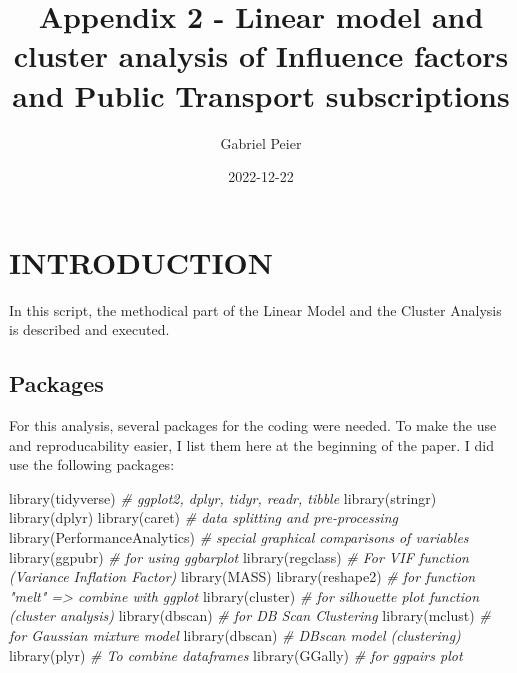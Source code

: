 \documentclass[
]{article}
\title{Appendix 2 - Linear model and cluster analysis of Influence
factors and Public Transport subscriptions}
\author{Gabriel Peier}
\date{2022-12-22}
\newenvironment{Shaded}{\begin{snugshade}}{\end{snugshade}}
\newcommand{\CommentTok}[1]{\textcolor[rgb]{0.56,0.35,0.01}{\textit{#1}}}
\newcommand{\FunctionTok}[1]{\textcolor[rgb]{0.00,0.00,0.00}{#1}}
\newcommand{\NormalTok}[1]{#1}
\begin{document}
\maketitle

\graphicspath{ {G:/My Drive/MasterThesis/Scripts/Outputs}}

\hypertarget{introduction}{%
\section{INTRODUCTION}\label{introduction}}

In this script, the methodical part of the Linear Model and the Cluster
Analysis is described and executed.

\hypertarget{packages}{%
\subsection{Packages}\label{packages}}

For this analysis, several packages for the coding were needed. To make
the use and reproducability easier, I list them here at the beginning of
the paper. I did use the following packages:

\begin{Shaded}
\begin{Highlighting}[]
\FunctionTok{library}\NormalTok{(tidyverse)             }\CommentTok{\# ggplot2, dplyr, tidyr, readr, tibble}
\FunctionTok{library}\NormalTok{(stringr)}
\FunctionTok{library}\NormalTok{(dplyr)}
\FunctionTok{library}\NormalTok{(caret)                 }\CommentTok{\# data splitting and pre{-}processing}
\FunctionTok{library}\NormalTok{(PerformanceAnalytics)  }\CommentTok{\# special graphical comparisons of variables}
\FunctionTok{library}\NormalTok{(ggpubr)                }\CommentTok{\# for using ggbarplot}
\FunctionTok{library}\NormalTok{(regclass)              }\CommentTok{\# For VIF function (Variance Inflation Factor)}
\FunctionTok{library}\NormalTok{(MASS)}
\FunctionTok{library}\NormalTok{(reshape2)              }\CommentTok{\# for function "melt" =\textgreater{} combine with ggplot}
\FunctionTok{library}\NormalTok{(cluster)               }\CommentTok{\# for silhouette plot function (cluster analysis)}
\FunctionTok{library}\NormalTok{(dbscan)                }\CommentTok{\# for DB Scan Clustering}
\FunctionTok{library}\NormalTok{(mclust)                }\CommentTok{\# for Gaussian mixture model}
\FunctionTok{library}\NormalTok{(dbscan)                }\CommentTok{\# DBscan model (clustering)}
\FunctionTok{library}\NormalTok{(plyr)                  }\CommentTok{\# To combine dataframes}
\FunctionTok{library}\NormalTok{(GGally)                }\CommentTok{\# for ggpairs plot}
\end{Highlighting}
\end{Shaded}
\end{document}
